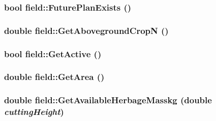 \label{classfield_a025a74a5935f44df084705be722fb0da}
\hypertarget{classfield_a266182a9e7fd4a4707e1e81c9ab23abe}{
\subsubsection[{FuturePlanExists}]{\setlength{\rightskip}{0pt plus 5cm}bool field::FuturePlanExists ()}}
\label{classfield_a266182a9e7fd4a4707e1e81c9ab23abe}
\hypertarget{classfield_a106ff033bc0271d52377d1c25b5e297b}{
\subsubsection[{GetAbovegroundCropN}]{\setlength{\rightskip}{0pt plus 5cm}double field::GetAbovegroundCropN ()}}
\label{classfield_a106ff033bc0271d52377d1c25b5e297b}
\hypertarget{classfield_a80a51fb0402683c89f7aa316210854e1}{
\subsubsection[{GetActive}]{\setlength{\rightskip}{0pt plus 5cm}bool field::GetActive ()}}
\label{classfield_a80a51fb0402683c89f7aa316210854e1}
\hypertarget{classfield_ac4c5edc4de9c9035c58c7204356a12b0}{
\subsubsection[{GetArea}]{\setlength{\rightskip}{0pt plus 5cm}double field::GetArea ()}}
\label{classfield_ac4c5edc4de9c9035c58c7204356a12b0}
\hypertarget{classfield_ac7b4f7eb002f1f49ce00734f2177cc87}{
\subsubsection[{GetAvailableHerbageMasskg}]{\setlength{\rightskip}{0pt plus 5cm}double field::GetAvailableHerbageMasskg (double {\em cuttingHeight})}}
